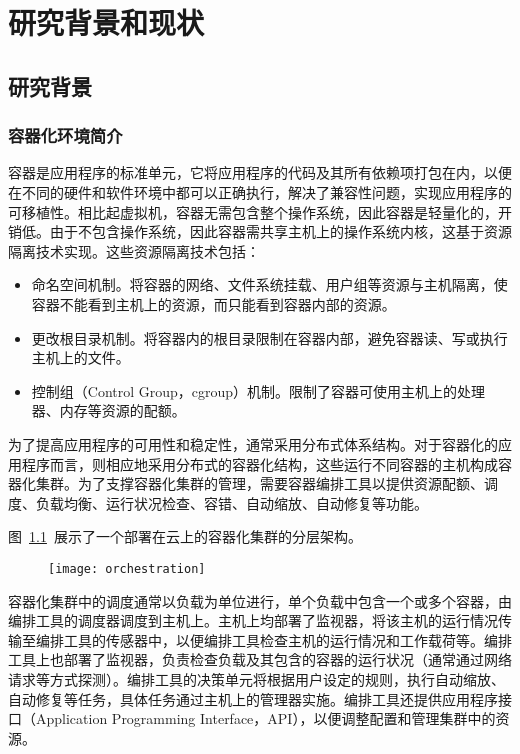 \chapter{研究背景和现状}{
{
\let\cleardoublepage\relax
}

\section{研究背景}

\subsection{容器化环境简介}

容器是应用程序的标准单元，它将应用程序的代码及其所有依赖项打包在内，以便在不同的硬件和软件环境中都可以正确执行，解决了兼容性问题，实现应用程序的可移植性\citep{whatcontainer}。相比起虚拟机，容器无需包含整个操作系统，因此容器是轻量化的，开销低\citep{Schenker2023}。由于不包含操作系统，因此容器需共享主机上的操作系统内核，这基于资源隔离技术实现\citep{Jain2020}。这些资源隔离技术包括：

\begin{itemize}
    \item 命名空间机制。将容器的网络、文件系统挂载、用户组等资源与主机隔离，使容器不能看到主机上的资源，而只能看到容器内部的资源。
    \item 更改根目录机制。将容器内的根目录限制在容器内部，避免容器读、写或执行主机上的文件。
    \item 控制组（Control Group，cgroup）机制。限制了容器可使用主机上的处理器、内存等资源的配额。
\end{itemize}

为了提高应用程序的可用性和稳定性，通常采用分布式体系结构。对于容器化的应用程序而言，则相应地采用分布式的容器化结构，这些运行不同容器的主机构成容器化集群。为了支撑容器化集群的管理，需要容器编排工具以提供资源配额、调度、负载均衡、运行状况检查、容错、自动缩放、自动修复等功能。

图~\ref{fig:orchestration}~展示了一个部署在云上的容器化集群的分层架构\citep{Casalicchio2019}。

\begin{figure}[t]
    \centering
    \texttt{[image: orchestration]}
    \label{fig:orchestration}

\end{figure}

容器化集群中的调度通常以负载为单位进行，单个负载中包含一个或多个容器，由编排工具的调度器调度到主机上。主机上均部署了监视器，将该主机的运行情况传输至编排工具的传感器中，以便编排工具检查主机的运行情况和工作载荷等。编排工具上也部署了监视器，负责检查负载及其包含的容器的运行状况（通常通过网络请求等方式探测）。编排工具的决策单元将根据用户设定的规则，执行自动缩放、自动修复等任务，具体任务通过主机上的管理器实施。编排工具还提供应用程序接口（Application Programming Interface，API），以便调整配置和管理集群中的资源。

}
